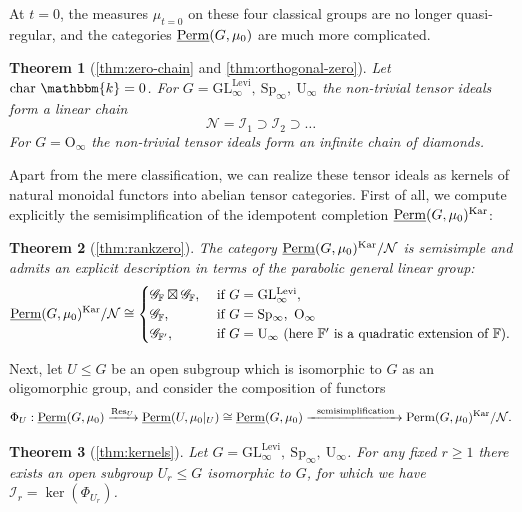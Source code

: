 \documentclass[11pt,a4paper]{amsart}
\theoremstyle{plain}%
\newtheorem{introtheorem}{Theorem}
\theoremstyle{definition}
\theoremstyle{remark}
\newcommand{\Res}{\operatorname{Res}}
\newcommand{\Perm}{\underline{{\rm Perm}}}
\newcommand{\F}{{\mathbb F}}
\newcommand{\kk}{\mathbbm{k}}
\newcommand{\Kar}{\mathrm{Kar}}
\newcommand{\I}{\mathcal{I}}
\newcommand{\boxt}{\mathbin{\boxtimes}}
\begin{document}
At $t =0$, the measures $\mu_{t=0}$ on these four classical groups are no longer quasi-regular, and the categories $\Perm(G,\mu_0)$ are much more complicated.

\begin{introtheorem}[\cref{thm:zero-chain} and \cref{thm:orthogonal-zero}] 
\mbox{}

Let $\mathrm{char}~\kk = 0$. For $G = \mathrm{GL^{Levi}_{\infty}, ~Sp_{\infty},~ U_{\infty}}$ the non-trivial tensor ideals form a linear chain \[ \mathcal{N} = \I_1 \supset \I_2 \supset \ldots\] For $G = \mathrm{O_{\infty}}$ the non-trivial tensor ideals form an infinite chain of diamonds.
\end{introtheorem}

Apart from the mere classification, we can realize these tensor ideals as kernels of natural monoidal functors into abelian tensor categories. First of all, we compute explicitly the semisimplification of the idempotent completion $\Perm(G, \mu_0)^{\Kar}$:
\begin{introtheorem}[\cref{thm:rankzero}]
    The category $\Perm(G,\mu_0)^{\Kar}/\mathcal{N}$ is semisimple and admits an explicit description in terms of the parabolic general linear group: 
\[
\Perm(G,\mu_0)^{\Kar}/\mathcal{N}\cong
 \begin{cases}
 \mathscr{G}_{\mathbb{F}}\boxt\mathscr{G}_{\F},&\text{ if } G= \mathrm{GL^{Levi}_{\infty}},\\
 \mathscr{G}_{\F},&\text{ if }G=\mathrm{Sp_{\infty},~ O_{\infty}}\\
  \mathscr{G}_{\F'},&\text{ if }G=\mathrm{U_{\infty}} \text{ (here } \F' \text{ is a quadratic extension of }\F).\\
 \end{cases}
\]

\end{introtheorem}
Next, let $U\leq G$ be an open subgroup which is isomorphic to $G$ as an oligomorphic group, and consider the composition of functors
\[
 \Phi_{U}:\Perm(G,\mu_0) \xrightarrow{\Res_{U}}
 \Perm(U,\mu_0|_U)\cong \Perm(G,\mu_0)\xrightarrow{~\text{ semisimplification }}\mathscr \Perm(G,\mu_0)^{\Kar}/\mathcal{N}.
\]



\begin{introtheorem}[\cref{thm:kernels}] Let $G = \mathrm{GL^{Levi}_{\infty}, ~Sp_{\infty},~ U_{\infty}}$. For any fixed $r\geq 1$ there exists an open subgroup $U_r\leq G$ isomorphic to $G$, for which we have $\I_r = \ker(\Phi_{U_r})$.
\end{introtheorem}
\end{document}

